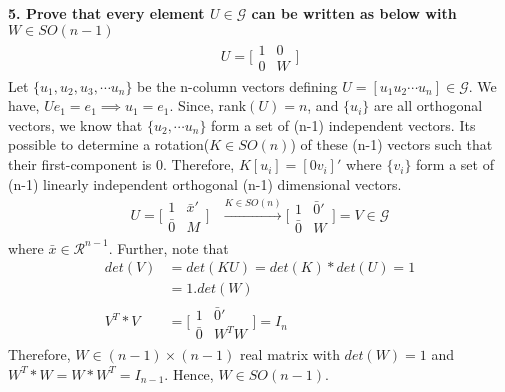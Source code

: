 \documentclass[11pt]{article}
\begin{document}
\textbf{5. Prove that every element $U \in \mathcal{G}$ can be written as below with $W \in SO(n-1)$
\begin{align}
U = \bigg[
\begin{array}{cc}
1 & 0\\
0 & W
\end{array}
\bigg] \label{eq:modifiedU}
\end{align}
}
Let $\{ u_1 , u_2, u_3, \cdots u_n \}$ be the n-column vectors defining $U =[ u_1 u_2 \cdots u_n]\in \mathcal{G}$. We have, $Ue_1 = e_1 \implies u_1 = e_1$. Since, rank$(U) = n$, and $\{u_i\}$ are all orthogonal vectors, we know that $ \{u_2, \cdots u_n\}$ form a set of (n-1) independent vectors. Its possible to determine a rotation($K \in SO(n)$) of these (n-1) vectors such that their first-component is 0. Therefore, $K[u_i] = [0 v_i]'$ where $\{v_i\}$ form a set of (n-1) linearly independent orthogonal (n-1) dimensional vectors.
\begin{align*}
U = \bigg[\begin{array}{cc}
1 & \bar{x}'\\
\bar{0} & M
\end{array}\bigg] &\xrightarrow{K \in SO(n)}
\bigg[\begin{array}{cc}
1 & \bar{0}'\\
\bar{0} & W
\end{array}\bigg] = V \in \mathcal{G}
\end{align*} where $\bar{x} \in \mathcal{R}^{n-1}$. Further, note that
\begin{align*}
det(V) &= det(KU) = det(K)*det(U) = 1\\
&= 1.det(W)\\
V^T*V  &= \bigg[\begin{array}{cc}
1 & \bar{0}'\\
\bar{0} & W^TW  
\end{array} \bigg] = I_n
\end{align*}
Therefore, $W \in (n-1)\times(n-1)$ real matrix with $det(W) = 1$ and $ W^T * W = W * W^T = I_{n-1}$. Hence, $W \in SO(n-1)$.

\hrulefill
\end{document}
